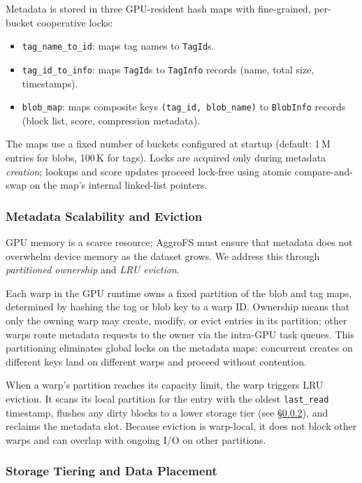 Metadata is stored in three GPU-resident hash maps with
fine-grained, per-bucket cooperative locks:

\begin{itemize}[nosep]
  \item \texttt{tag\_name\_to\_id}: maps tag names to
    \texttt{TagId}s.
  \item \texttt{tag\_id\_to\_info}: maps \texttt{TagId}s to
    \texttt{TagInfo} records (name, total size, timestamps).
  \item \texttt{blob\_map}: maps composite keys
    \texttt{(tag\_id, blob\_name)} to \texttt{BlobInfo} records
    (block list, score, compression metadata).
\end{itemize}

\noindent
The maps use a fixed number of buckets configured at startup (default:
1\,M entries for blobs, 100\,K for tags).  Locks are acquired only
during metadata \emph{creation}; lookups and score updates proceed
lock-free using atomic compare-and-swap on the map's internal
linked-list pointers.

\subsubsection{Metadata Scalability and Eviction}
\label{sec:meta-evict}

GPU memory is a scarce resource; AggroFS must ensure that metadata
does not overwhelm device memory as the dataset grows.  We address
this through \emph{partitioned ownership} and \emph{LRU eviction}.

Each warp in the GPU runtime owns a fixed partition of the blob and
tag maps, determined by hashing the tag or blob key to a warp ID\@.
Ownership means that only the owning warp may create, modify, or
evict entries in its partition; other warps route metadata requests
to the owner via the intra-GPU task queues.
This partitioning eliminates global locks on the metadata maps:
concurrent creates on different keys land on different warps and
proceed without contention.

When a warp's partition reaches its capacity limit, the warp triggers
LRU eviction.  It scans its local partition for the entry with the
oldest \texttt{last\_read} timestamp, flushes any dirty blocks to
a lower storage tier (see \S\ref{sec:tiering}), and reclaims the
metadata slot.  Because eviction is warp-local, it does not block
other warps and can overlap with ongoing I/O on other partitions.

\subsubsection{Storage Tiering and Data Placement}
\label{sec:tiering}

